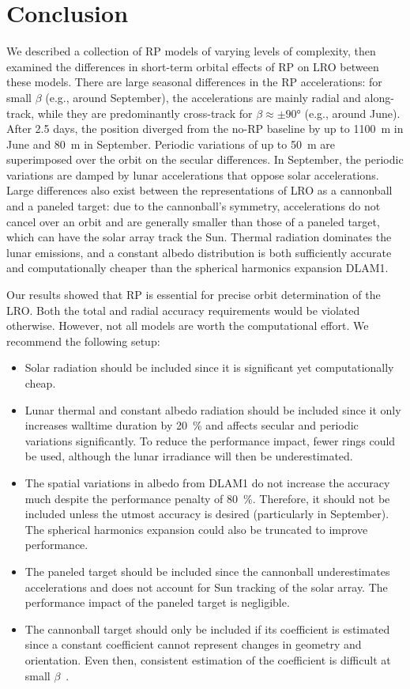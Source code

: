 \section{Conclusion}

We described a collection of \gls{RP} models of varying levels of complexity, then examined the differences in short-term orbital effects of \gls{RP} on \gls{LRO} between these models. There are large seasonal differences in the \gls{RP} accelerations: for small $\beta$ (e.g., around September), the accelerations are mainly radial and along-track, while they are predominantly cross-track for $\beta \approx \pm \ang{90}$ (e.g., around June). After 2.5 days, the position diverged from the no-\gls{RP} baseline by up to \qty{1100}{\m} in June and \qty{80}{\m} in September. Periodic variations of up to \qty{50}{\m} are superimposed over the orbit on the secular differences. In September, the periodic variations are damped by lunar accelerations that oppose solar accelerations. Large differences also exist between the representations of \gls{LRO} as a cannonball and a paneled target: due to the cannonball's symmetry, accelerations do not cancel over an orbit and are generally smaller than those of a paneled target, which can have the solar array track the Sun. Thermal radiation dominates the lunar emissions, and a constant albedo distribution is both sufficiently accurate and computationally cheaper than the spherical harmonics expansion \gls{DLAM1}.

Our results showed that \gls{RP} is essential for precise orbit determination of the \gls{LRO}. Both the total and radial accuracy requirements would be violated otherwise. However, not all models are worth the computational effort. We recommend the following setup:
\begin{itemize}
    \item Solar radiation should be included since it is significant yet computationally cheap.
    \item Lunar thermal and constant albedo radiation should be included since it only increases walltime duration by \qty{20}{\percent} and affects secular and periodic variations significantly. To reduce the performance impact, fewer rings could be used, although the lunar irradiance will then be underestimated.
    \item The spatial variations in albedo from \gls{DLAM1} do not increase the accuracy much despite the performance penalty of \qty{80}{\percent}. Therefore, it should not be included unless the utmost accuracy is desired (particularly in September). The spherical harmonics expansion could also be truncated to improve performance.
    \item The paneled target should be included since the cannonball underestimates accelerations and does not account for Sun tracking of the solar array. The performance impact of the paneled target is negligible.
    \item The cannonball target should only be included if its coefficient is estimated since a constant coefficient cannot represent changes in geometry and orientation. Even then, consistent estimation of the coefficient is difficult at small $\beta$~\cite{Slojkowski2014}.
\end{itemize}

